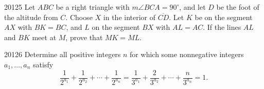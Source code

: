 \begin{problem}{2012}{5}
Let $ABC$ be a right triangle with $m\angle BCA=90^\circ$, and let $D$ be the foot of the altitude from $C$. Choose $X$ in the interior of $\overline{CD}$. Let $K$ be on the segment $AX$ with $BK=BC$, and $L$ on the segment $BX$ with $AL=AC$. If the lines $AL$ and $BK$ meet at $M$, prove that $MK=ML$.
\end{problem}

\begin{problem}{2012}{6}
Determine all positive integers $n$ for which some nonnegative integers $a_1, \dots, a_n$ satisfy
\[
    \frac1{2^{a_1}}+\frac1{2^{a_2}}+\cdots+\frac1{2^{a_n}}
    =\frac1{3^{a_1}}+\frac2{3^{a_2}}+\cdots+\frac n{3^{a_n}}=1.
\]
\end{problem}
